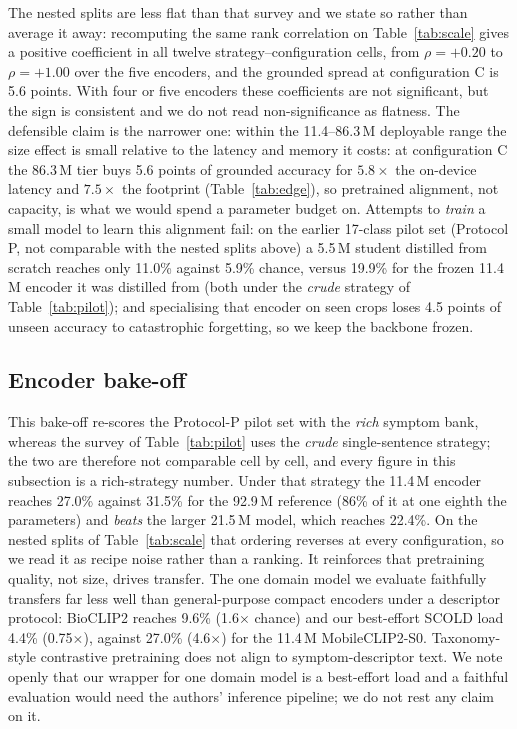 \documentclass[a4paper,fleqn]{cas-dc}
\begin{document}
The nested splits are less flat than that survey and we state so rather than
average it away: recomputing the same rank correlation on Table~\ref{tab:scale} gives a positive
coefficient in all twelve strategy--configuration cells, from $\rho = +0.20$ to $\rho = +1.00$
over the five encoders, and the grounded spread at configuration C is 5.6 points. With four or
five encoders these coefficients are not significant, but the sign is consistent and we do not
read non-significance as flatness. The defensible claim is the narrower one: within the
11.4--86.3\,M deployable range the size effect is small relative to the latency and memory it
costs: at configuration C the 86.3\,M tier buys 5.6 points of grounded accuracy for
$5.8\times$ the on-device latency and $7.5\times$ the footprint (Table~\ref{tab:edge}), so
pretrained alignment, not capacity, is what we would spend a parameter budget on. Attempts to
\emph{train} a small model to learn this alignment fail:
on the earlier 17-class pilot set (Protocol P, not comparable with the nested splits above)
a 5.5\,M student distilled from scratch reaches only 11.0\% against 5.9\% chance, versus 19.9\%
for the frozen 11.4\,M encoder it was distilled from (both under the \emph{crude} strategy of
Table~\ref{tab:pilot}); and specialising that encoder on seen crops
loses 4.5 points of unseen
accuracy to catastrophic forgetting, so we keep the backbone frozen.




\subsection{Encoder bake-off}
\label{sec:bakeoff}

This bake-off re-scores the Protocol-P pilot set with the \emph{rich} symptom bank, whereas the
survey of Table~\ref{tab:pilot} uses the \emph{crude} single-sentence strategy; the two are
therefore not comparable cell by cell, and every figure in this subsection is a rich-strategy
number. Under that strategy the 11.4\,M encoder reaches 27.0\% against 31.5\% for the 92.9\,M
reference (86\% of it at one eighth the parameters) and \emph{beats} the larger 21.5\,M
model, which reaches 22.4\%. On the nested splits of Table~\ref{tab:scale} that ordering reverses
at every configuration, so we read it as recipe noise rather than a ranking. It reinforces that pretraining
quality, not size, drives transfer. The one domain model we evaluate faithfully transfers far less well
than general-purpose compact encoders under a descriptor protocol: BioCLIP2 reaches
9.6\% (1.6$\times$ chance) and our best-effort SCOLD load 4.4\% (0.75$\times$), against
27.0\% (4.6$\times$) for the 11.4\,M MobileCLIP2-S0. Taxonomy-style contrastive pretraining
does not align to symptom-descriptor text. We note openly that our wrapper for one domain model is a best-effort load and
a faithful evaluation would need the authors' inference pipeline; we do not rest any claim on it.
\end{document}
